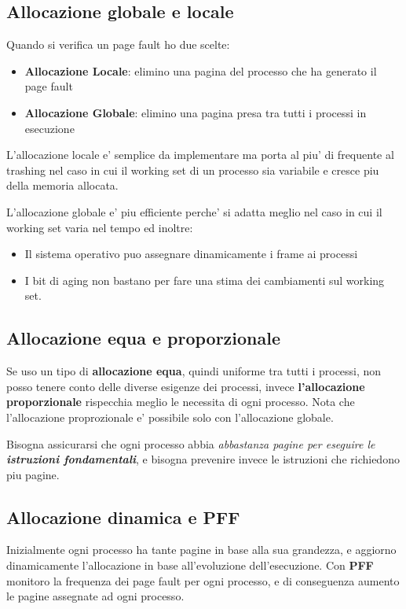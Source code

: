 
\subsection{Allocazione globale e locale}
Quando si verifica un page fault ho due scelte:
\begin{itemize}
    \item \textbf{Allocazione Locale}: elimino una pagina del processo che ha generato il page fault
    \item \textbf{Allocazione Globale}: elimino una pagina presa tra tutti i processi in esecuzione
\end{itemize}

L'allocazione locale e' semplice da implementare ma porta al piu' di frequente al trashing nel caso in 
cui il working set di un processo sia variabile e cresce piu della memoria allocata.

L'allocazione globale e' piu efficiente perche' si adatta meglio nel caso in cui il working set varia nel tempo ed inoltre:
\begin{itemize}
    \item Il sistema operativo puo assegnare dinamicamente i frame ai processi
    \item I bit di aging non bastano per fare una stima dei cambiamenti sul working set.
\end{itemize}

\subsection{Allocazione equa e proporzionale}
Se uso un tipo di \textbf{allocazione equa}, quindi uniforme tra tutti i processi, non posso tenere conto
delle diverse esigenze dei processi, invece \textbf{l'allocazione proporzionale} rispecchia meglio 
le necessita di ogni processo. Nota che l'allocazione proprozionale e' possibile solo con l'allocazione globale.

Bisogna assicurarsi che ogni processo abbia \textit{abbastanza pagine per eseguire le \textbf{istruzioni fondamentali}},
e bisogna prevenire invece le istruzioni che richiedono piu pagine.

\subsection{Allocazione dinamica e PFF}
Inizialmente ogni processo ha tante pagine in base alla sua grandezza, e aggiorno dinamicamente 
l'allocazione in base all'evoluzione dell'esecuzione.
Con \textbf{PFF} monitoro la frequenza dei page fault per ogni processo, e di conseguenza aumento le pagine 
assegnate ad ogni processo.

